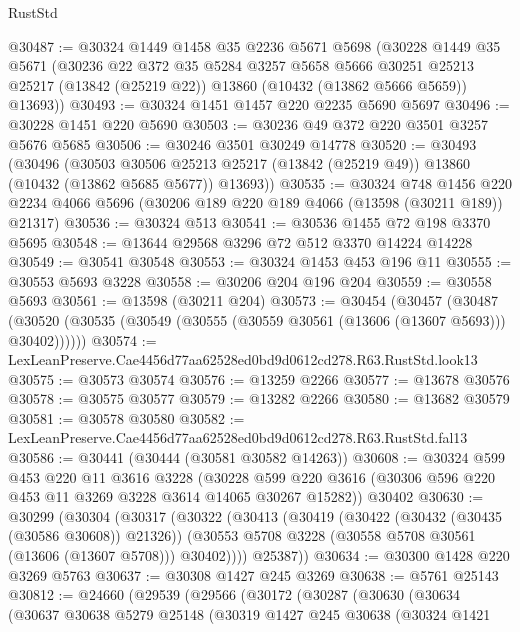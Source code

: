 \begin{lexlean}{RustStd}
\begin{coremodule}
@30487 := @30324
    @1449
    @1458
    @35
    @2236
    @5671
    @5698
    (@30228
      @1449
      @35
      @5671
      (@30236
        @22
        @372
        @35
        @5284
        @3257
        @5658
        @5666
        @30251
        @25213
        @25217
        (@13842 (@25219 @22))
        @13860
        (@10432 (@13862 @5666 @5659))
        @13693))
@30493 := @30324 @1451 @1457 @220 @2235 @5690 @5697
@30496 := @30228 @1451 @220 @5690
@30503 := @30236 @49 @372 @220 @3501 @3257 @5676 @5685
@30506 := @30246 @3501 @30249 @14778
@30520 := @30493
    (@30496
      (@30503
        @30506
        @25213
        @25217
        (@13842 (@25219 @49))
        @13860
        (@10432 (@13862 @5685 @5677))
        @13693))
@30535 := @30324
    @748
    @1456
    @220
    @2234
    @4066
    @5696
    (@30206 @189 @220 @189 @4066 (@13598 (@30211 @189)) @21317)
@30536 := @30324 @513
@30541 := @30536 @1455 @72 @198 @3370 @5695
@30548 := @13644 @29568 @3296 @72 @512 @3370 @14224 @14228
@30549 := @30541 @30548
@30553 := @30324 @1453 @453 @196 @11
@30555 := @30553 @5693 @3228
@30558 := @30206 @204 @196 @204
@30559 := @30558 @5693
@30561 := @13598 (@30211 @204)
@30573 := @30454
    (@30457
      (@30487 (@30520 (@30535 (@30549 (@30555 (@30559 @30561 (@13606 (@13607 @5693))) @30402))))))
@30574 := LexLeanPreserve.Cae4456d77aa62528ed0bd9d0612cd278.R63.RustStd.look13
@30575 := @30573 @30574
@30576 := @13259 @2266
@30577 := @13678 @30576
@30578 := @30575 @30577
@30579 := @13282 @2266
@30580 := @13682 @30579
@30581 := @30578 @30580
@30582 := LexLeanPreserve.Cae4456d77aa62528ed0bd9d0612cd278.R63.RustStd.fal13
@30586 := @30441 (@30444 (@30581 @30582 @14263))
@30608 := @30324
    @599
    @453
    @220
    @11
    @3616
    @3228
    (@30228 @599 @220 @3616 (@30306 @596 @220 @453 @11 @3269 @3228 @3614 @14065 @30267 @15282))
    @30402
@30630 := @30299
    (@30304
      (@30317
        (@30322
          (@30413
            (@30419
              (@30422 (@30432 (@30435 (@30586 @30608)) @21326))
              (@30553 @5708 @3228 (@30558 @5708 @30561 (@13606 (@13607 @5708))) @30402))))
        @25387))
@30634 := @30300 @1428 @220 @3269 @5763
@30637 := @30308 @1427 @245 @3269
@30638 := @5761 @25143
@30812 := @24660
    (@29539
      (@29566
        (@30172
          (@30287
            (@30630
              (@30634
                (@30637
                  @30638
                  @5279
                  @25148
                  (@30319
                    @1427
                    @245
                    @30638
                    (@30324
                      @1421

\end{coremodule}
\end{lexlean}
